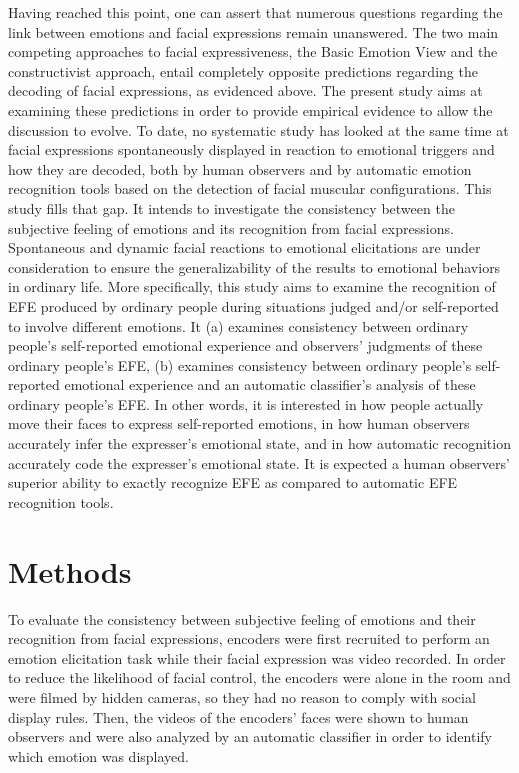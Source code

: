 \documentclass[man]{apa6}
\begin{document}
Having reached this point, one can assert that numerous questions regarding the link between emotions and facial expressions remain unanswered. The two main competing approaches to facial expressiveness, the Basic Emotion View and the constructivist approach, entail completely opposite predictions regarding the decoding of facial expressions, as evidenced above. The present study aims at examining these predictions in order to provide empirical evidence to allow the discussion to evolve. To date, no systematic study has looked at the same time at facial expressions spontaneously displayed in reaction to emotional triggers and how they are decoded, both by human observers and by automatic emotion recognition tools based on the detection of facial muscular configurations. This study fills that gap. It intends to investigate the consistency between the subjective feeling of emotions and its recognition from facial expressions. Spontaneous and dynamic facial reactions to emotional elicitations are under consideration to ensure the generalizability of the results to emotional behaviors in ordinary life. More specifically, this study aims to examine the recognition of EFE produced by ordinary people during situations judged and/or self-reported to involve different emotions. It (a) examines consistency between ordinary people's self-reported emotional experience and observers' judgments of these ordinary people's EFE, (b) examines consistency between ordinary people's self-reported emotional experience and an automatic classifier's analysis of these ordinary people's EFE. In other words, it is interested in how people actually move their faces to express self-reported emotions, in how human observers accurately infer the expresser's emotional state, and in how automatic recognition accurately code the expresser's emotional state. It is expected a human observers' superior ability to exactly recognize EFE as compared to automatic EFE recognition tools.

\hypertarget{methods}{%
\section{Methods}\label{methods}}

To evaluate the consistency between subjective feeling of emotions and their recognition from facial expressions, encoders were first recruited to perform an emotion elicitation task while their facial expression was video recorded. In order to reduce the likelihood of facial control, the encoders were alone in the room and were filmed by hidden cameras, so they had no reason to comply with social display rules. Then, the videos of the encoders' faces were shown to human observers and were also analyzed by an automatic classifier in order to identify which emotion was displayed.
\end{document}
